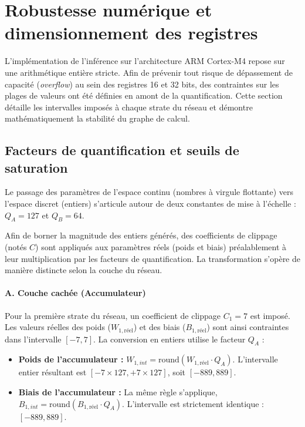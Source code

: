 \documentclass[11pt, a4paper]{article}
\begin{document}
\section{Robustesse numérique et dimensionnement des registres}

L'implémentation de l'inférence sur l'architecture ARM Cortex-M4 repose sur une arithmétique entière stricte. Afin de prévenir tout risque de dépassement de capacité (\textit{overflow}) au sein des registres 16 et 32 bits, des contraintes sur les plages de valeurs ont été définies en amont de la quantification. Cette section détaille les intervalles imposés à chaque strate du réseau et démontre mathématiquement la stabilité du graphe de calcul.

\subsection{Facteurs de quantification et seuils de saturation}

Le passage des paramètres de l'espace continu (nombres à virgule flottante) vers l'espace discret (entiers) s'articule autour de deux constantes de mise à l'échelle : $Q_A = 127$ et $Q_B = 64$. 

Afin de borner la magnitude des entiers générés, des coefficients de clippage (notés $C$) sont appliqués aux paramètres réels (poids et biais) préalablement à leur multiplication par les facteurs de quantification. La transformation s'opère de manière distincte selon la couche du réseau.

\paragraph{A. Couche cachée (Accumulateur)}
Pour la première strate du réseau, un coefficient de clippage $C_1 = 7$ est imposé. Les valeurs réelles des poids ($W_{1,\text{réel}}$) et des biais ($B_{1,\text{réel}}$) sont ainsi contraintes dans l'intervalle $[-7, 7]$. La conversion en entiers utilise le facteur $Q_A$ :
\begin{itemize}
    \item \textbf{Poids de l'accumulateur :} $W_{1,int} = \text{round}(W_{1,\text{réel}} \cdot Q_A)$. L'intervalle entier résultant est $[-7 \times 127, +7 \times 127]$, soit \textbf{$[-889, 889]$}.
    \item \textbf{Biais de l'accumulateur :} La même règle s'applique, $B_{1,int} = \text{round}(B_{1,\text{réel}} \cdot Q_A)$. L'intervalle est strictement identique : \textbf{$[-889, 889]$}.
\end{itemize}
\end{document}
